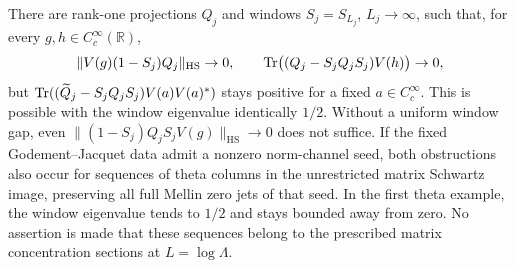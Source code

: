 \begin{proposition}
\label{glnw:normalization-insufficiency}
There are rank-one projections $Q_j$ and windows $S_j=S_{L_j}$,
$L_j\to\infty$, such that, for every $g,h\in C_c^\infty(\mathbb R)$,
\begin{equation}\label{glnw:left-smoothing-counterexample}
 \|V(g)(1-S_j)Q_j\|_{\mathrm{HS}}\to0,\qquad
 \operatorname{Tr}\bigl((Q_j-S_jQ_jS_j)V(h)\bigr)\to0,
\end{equation}
but $\operatorname{Tr}((\widetilde Q_j-S_jQ_jS_j)V(a)V(a)^*)$ stays positive
for a fixed $a\in C_c^\infty$. This is possible with the window
eigenvalue identically $1/2$. Without a uniform window gap, even
$\|(1-S_j)Q_jS_jV(g)\|_{\mathrm{HS}}\to0$ does not suffice.
If the fixed Godement--Jacquet data admit a nonzero norm-channel
seed, both obstructions also occur for sequences of theta
columns in the unrestricted matrix Schwartz image, preserving
all full Mellin zero jets of that seed. In the first theta example,
the window eigenvalue tends to $1/2$ and stays bounded away from zero.
No assertion is made that
these sequences belong to the prescribed matrix concentration
sections at $L=\log\Lambda$.
\end{proposition}
